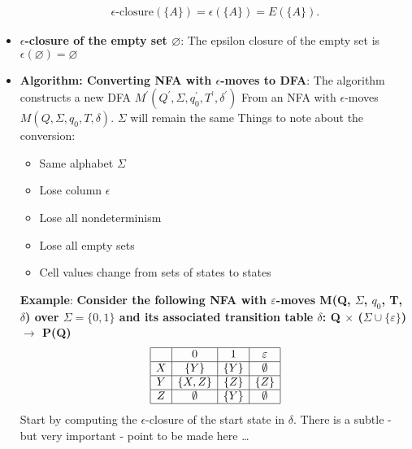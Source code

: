 \documentclass{report}
\begin{document}
\begin{itemize}
\begin{align*}
                \epsilon\text{-closure}(\{A\}) = \epsilon(\{A\}) = E(\{A\})
            .\end{align*}
        \item \textbf{$\epsilon$-closure of the empty set $\varnothing$}: The epsilon closure of the empty set is $\epsilon(\varnothing)  = \varnothing$
        \item \textbf{Algorithm: Converting NFA with $\epsilon$-moves to DFA}: The algorithm constructs a new DFA $M^{\prime}(Q^{\prime}, \Sigma, q_{0}^{\prime}, T^{\prime}, \delta^{\prime}) $ From an NFA with $\epsilon$-moves $M(Q, \Sigma, q_{0}, T, \delta) $. $\Sigma$ will remain the same
            \bigbreak \noindent 
            Things to note about the conversion:
            \begin{itemize}
                \item Same alphabet $\Sigma $
                \item Lose column $\epsilon$
                \item Lose all nondeterminism
                \item Lose all empty sets
                \item Cell values change from sets of states to states
            \end{itemize}
            \bigbreak \noindent 
            \textbf{Example}:
            \textbf{Consider the following NFA with $\varepsilon$-moves M(Q, $\Sigma$, $q_0$, T, $\delta$) over $\Sigma = \{0, 1\}$ and its associated transition table $\delta$: Q $\times$ ($\Sigma \cup \{\varepsilon\}$) $\rightarrow$ P(Q)}
            \bigbreak \noindent 
            \[
                \begin{array}{|c|c|c|c|}
                    \hline
                     & 0 & 1 & \varepsilon \\
                    \hline
                    X & \{Y\} & \{Y\} & \emptyset \\
                    \hline
                    Y & \{X, Z\} & \{Z\} & \{Z\} \\
                    \hline
                    Z & \emptyset & \{Y\} & \emptyset \\
                    \hline
                \end{array}
            \]
            \bigbreak \noindent 
            Start by computing the $\epsilon$-closure of the start state in $\delta$.
            \bigbreak \noindent 
            \bigbreak \noindent 
            There is a subtle - but very important - point to be made here …

\end{itemize}
\end{document}
